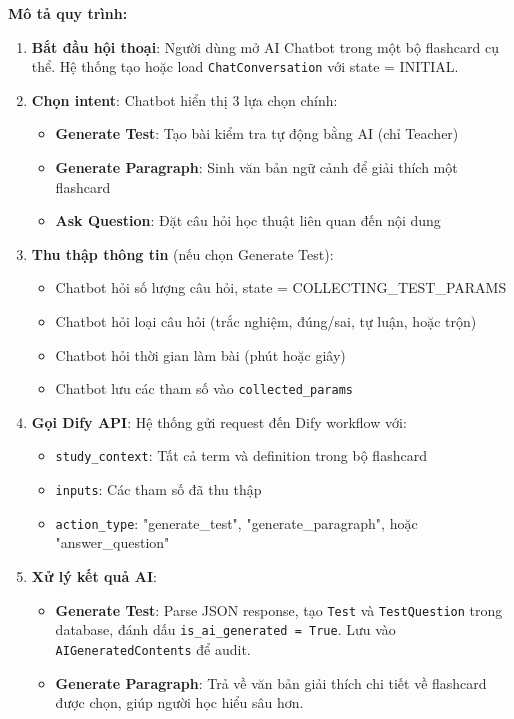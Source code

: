 \documentclass[../DoAn.tex]{subfiles}
\begin{document}
\textbf{Mô tả quy trình:}
\begin{enumerate}
    \item \textbf{Bắt đầu hội thoại}: Người dùng mở AI Chatbot trong một bộ flashcard cụ thể. Hệ thống tạo hoặc load \texttt{ChatConversation} với state = INITIAL.
    \item \textbf{Chọn intent}: Chatbot hiển thị 3 lựa chọn chính:
    \begin{itemize}
        \item \textbf{Generate Test}: Tạo bài kiểm tra tự động bằng AI (chỉ Teacher)
        \item \textbf{Generate Paragraph}: Sinh văn bản ngữ cảnh để giải thích một flashcard
        \item \textbf{Ask Question}: Đặt câu hỏi học thuật liên quan đến nội dung
    \end{itemize}
    \item \textbf{Thu thập thông tin} (nếu chọn Generate Test):
    \begin{itemize}
        \item Chatbot hỏi số lượng câu hỏi, state = COLLECTING\_TEST\_PARAMS
        \item Chatbot hỏi loại câu hỏi (trắc nghiệm, đúng/sai, tự luận, hoặc trộn)
        \item Chatbot hỏi thời gian làm bài (phút hoặc giây)
        \item Chatbot lưu các tham số vào \texttt{collected\_params}
    \end{itemize}
    \item \textbf{Gọi Dify API}: Hệ thống gửi request đến Dify workflow với:
    \begin{itemize}
        \item \texttt{study\_context}: Tất cả term và definition trong bộ flashcard
        \item \texttt{inputs}: Các tham số đã thu thập
        \item \texttt{action\_type}: "generate\_test", "generate\_paragraph", hoặc "answer\_question"
    \end{itemize}
    \item \textbf{Xử lý kết quả AI}:
    \begin{itemize}
        \item \textbf{Generate Test}: Parse JSON response, tạo \texttt{Test} và \texttt{TestQuestion} trong database, đánh dấu \texttt{is\_ai\_generated = True}. Lưu vào \texttt{AIGeneratedContents} để audit.
        \item \textbf{Generate Paragraph}: Trả về văn bản giải thích chi tiết về flashcard được chọn, giúp người học hiểu sâu hơn.

\end{itemize}
\end{enumerate}
\end{document}
